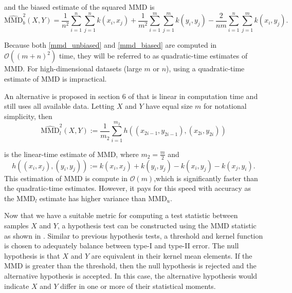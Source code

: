 and the biased estimate of the squared MMD is
\begin{equation}
\label{mmd_biased}
\widehat{\text{MMD}}_{b}^{2}(X, Y)= \frac{1}{n^{2}} \sum_{i=1}^{n} \sum_{j=1}^{n} k\left(x_{i}, x_{j}\right)+\frac{1}{m^{2}} \sum_{i=1}^{m} \sum_{j=1}^{m} k\left(y_{i}, y_{j}\right)-\frac{2}{n m} \sum_{i=1}^{n} \sum_{j=1}^{m} k\left(x_{i}, y_{j}\right).
\end{equation}

Because both \ref{mmd_unbiased} and \ref{mmd_biased} are computed in $\mathcal{O}((m + n)^2)$ time, they will be referred to as quadratic-time estimates of MMD. For high-dimensional datasets (large $m$ or $n$), using a quadratic-time estimate of MMD is impractical. 

An alternative is proposed in section 6 of \cite{gretton2012kernel} that is linear in computation time and still uses all available data. Letting $X$ and $Y$ have equal size $m$ for notational simplicity, then
\begin{equation}
\label{mmd_linear}
\widehat{\text{MMD}}_{l}^{2}(X, Y) :=\frac{1}{m_{2}} \sum_{i=1}^{m_{2}} h\left(\left(x_{2 i-1}, y_{2 i-1}\right),\left(x_{2 i}, y_{2 i}\right)\right)
\end{equation}

is the linear-time estimate of MMD, where $m_2=\frac{m}{2}$ and
\begin{equation}
h\left((x_i, x_j), (y_i, y_j)\right):=k\left(x_{i}, x_{j}\right)+k\left(y_{i}, y_{j}\right)-k\left(x_{i}, y_{j}\right)-k\left(x_{j}, y_{i}\right).
\end{equation}
This estimation of MMD is compute in $\mathcal{O}(m)$,which is significantly faster than the quadratic-time estimates. However, it pays for this speed with accuracy as the MMD$_l$ estimate has higher variance than MMD$_u$.

Now that we have a suitable metric for computing a test statistic between samples $X$ and $Y$, a hypothesis test can be constructed using the MMD statistic as shown in \cite{gretton2012kernel}. Similar to previous hypothesis tests, a threshold and kernel function is chosen to adequately balance between type-I and type-II error. The null hypothesis is that $X$ and $Y$ are equivalent in their kernel mean elements.  If the MMD is greater than the threshold, then the null hypothesis is rejected and the alternative hypothesis is accepted. In this case, the alternative hypothesis would indicate $X$ and $Y$ differ in one  or more of their statistical moments.

